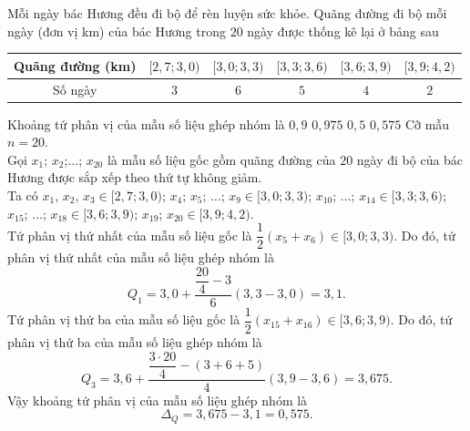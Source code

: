 \begin{ex}%
	Mỗi ngày bác Hương đều đi bộ để rèn luyện sức khỏe. Quãng đường đi bộ mỗi ngày (đơn vị km) của bác Hương trong $20$ ngày được thống kê lại ở bảng sau
	\begin{center}
		\begin{tabular}{|c|c|c|c|c|c|}
			\hline
			Quãng đường (km) & $[2{,}7;3{,}0)$ & $[3{,}0;3{,}3)$ & $[3{,}3;3{,}6)$ & $[3{,}6;3{,}9)$ & $[3{,}9;4{,}2)$ \\
			\hline
			Số ngày          & $3$             & $6$             & $5$             & $4$             & $2$             \\
			\hline
		\end{tabular}
	\end{center}
	Khoảng tứ phân vị của mẫu số liệu ghép nhóm là
	\choice
	{$0{,}9$}
	{$0{,}975$}
	{$0{,}5$}
	{\True $0{,}575$}
	\loigiai
	{
	Cỡ mẫu $n=20$.\\
	Gọi $x_1$; $x_2$;$\ldots$; $x_{20}$ là mẫu số liệu gốc gồm quãng đường của $20$ ngày đi bộ của bác Hương được sắp xếp theo thứ tự không giảm.\\
	Ta có $x_1$, $x_2$, $x_3\in [2{,}7;3{,}0)$; $x_4$; $x_5$; $\ldots$; $x_9\in [3{,}0;3{,}3)$; $x_{10}$; $\ldots$; $x_{14}\in [3{,}3;3{,}6)$; $x_{15}$; $\ldots$; $x_{18}\in [3{,}6;3{,}9)$; $x_{19}$; $x_{20}\in [3{,}9;4{,}2)$.\\
	Tứ phân vị thứ nhất của mẫu số liệu gốc là $\dfrac{1}{2}(x_5+x_6)\in [3{,}0;3{,}3)$. Do đó, tứ phân vị thứ nhất của mẫu số liệu ghép nhóm là
	\[Q_1=3{,}0+\dfrac{\dfrac{20}{4}-3}{6}(3{,}3-3{,}0)=3{,}1.\]
	Tứ phân vị thứ ba của mẫu số liệu gốc là $\dfrac{1}{2}(x_{15}+x_{16})\in [3{,}6;3{,}9)$. Do đó, tứ phân vị thứ ba của mẫu số liệu ghép nhóm là
	\[Q_3=3{,}6+\dfrac{\dfrac{3\cdot 20}{4}-(3+6+5)}{4}(3{,}9-3{,}6)=3{,}675.\]
	Vậy khoảng tứ phân vị của mẫu số liệu ghép nhóm là
	\[\Delta_Q=3{,}675-3{,}1=0{,}575.\]
	}
\end{ex}

